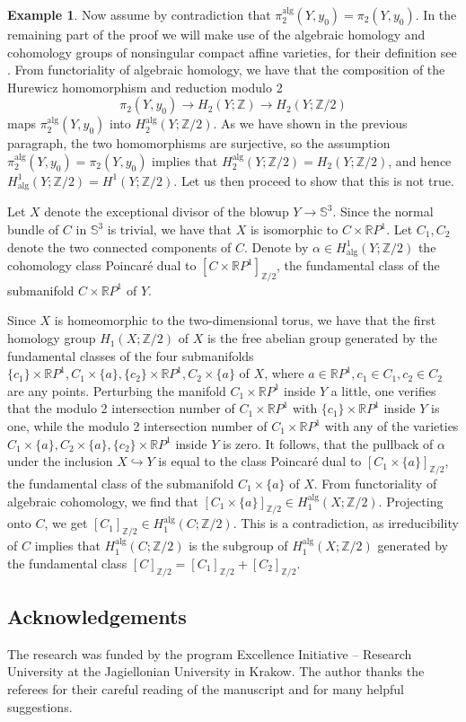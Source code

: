 \documentclass{article}
\theoremstyle{plain}
\theoremstyle{definition}
\newtheorem{ex}[thm]{Example}
\theoremstyle{remark}
\newcommand{\R}{\mathbb{R}}
\newcommand{\s}{\mathbb{S}}
\newcommand{\alg}{\mathrm{alg}}
\begin{document}
\begin{ex}
Now assume by contradiction that $\pi_2^\alg(Y,y_0)= \pi_2(Y,y_0)$. In the remaining part of the proof we will make use of the algebraic homology and cohomology groups of nonsingular compact affine varieties, for their definition see \cite[p. 273]{bochnakRealAlgebraicGeometry1998}. From functoriality of algebraic homology, we have that the composition of the Hurewicz homomorphism and reduction modulo 2
\begin{equation*}
    \pi_2(Y,y_0)\rightarrow H_2(Y;\mathbb Z)\rightarrow H_2(Y;\mathbb Z/2)
\end{equation*}
maps $\pi_2^\alg(Y,y_0)$ into $H_2^\alg(Y;\mathbb Z/2)$. As we have shown in the previous paragraph, the two homomorphisms are surjective, so the assumption $\pi_2^\alg(Y,y_0)= \pi_2(Y,y_0)$ implies that $H^\alg_2(Y;\mathbb Z/2)=H_2(Y;\mathbb Z/2)$, and hence $H^1_\alg(Y;\mathbb Z/2)=H^1(Y;\mathbb Z/2)$. Let us then proceed to show that this is not true.

Let $X$ denote the exceptional divisor of the blowup $Y\rightarrow \s^3$. Since the normal bundle of $C$ in $\s^3$ is trivial, we have that $X$ is isomorphic to $C\times \R P^1$. Let $C_1,C_2$ denote the two connected components of $C$. Denote by $\alpha \in H^1_\alg(Y;\mathbb Z/2)$ the cohomology class Poincar\'{e} dual to $[C\times \R P^1]_{\mathbb Z/2}$, the fundamental class of the submanifold $C\times \R P^1$ of $Y$.

Since $X$ is homeomorphic to the two-dimensional torus, we have that the first homology group $H_1(X;\mathbb Z/2)$ of $X$ is the free abelian group generated by the fundamental classes of the four submanifolds $\{c_1\}\times \R P^1,C_1\times \{a\},\{c_2\}\times \R P^1,C_2\times \{a\}$ of $X$, where $a\in \R P^1,c_1\in C_1,c_2\in C_2$ are any points. Perturbing the manifold $C_1\times \R P^1$ inside $Y$ a little, one verifies that the modulo 2 intersection number of $C_1\times \R P^1$ with $\{c_1\}\times \R P^1$ inside $Y$ is one, while the modulo 2 intersection number of $C_1\times \R P^1$ with any of the varieties $C_1\times \{a\},C_2\times \{a\},\{c_2\}\times \R P^1$ inside $Y$ is zero. It follows, that the pullback of $\alpha$ under the inclusion $X\hookrightarrow Y$ is equal to the class Poincar\'{e} dual to $[C_1\times \{a\}]_{\mathbb Z/2}$, the fundamental class of the submanifold $C_1\times \{a\}$ of $X$. From functoriality of algebraic cohomology, we find that $[C_1\times \{a\}]_{\mathbb Z/2}\in H_1^\alg(X;\mathbb Z/2)$. Projecting onto $C$, we get $[C_1]_{\mathbb Z/2}\in H_1^\alg(C;\mathbb Z/2)$. This is a contradiction, as irreducibility of $C$ implies that $H_1^\alg(C;\mathbb Z/2)$ is the subgroup of $H_1^\alg(X;\mathbb Z/2)$ generated by the fundamental class $[C]_{\mathbb Z/2}=[C_1]_{\mathbb Z/2}+[C_2]_{\mathbb Z/2}$.
\end{ex}
\subsection*{Acknowledgements}
The research was funded by the program Excellence Initiative – Research University at the Jagiellonian University in Krakow. The author thanks the referees for their careful reading of the manuscript and for many helpful suggestions.
\printbibliography
\end{document}

